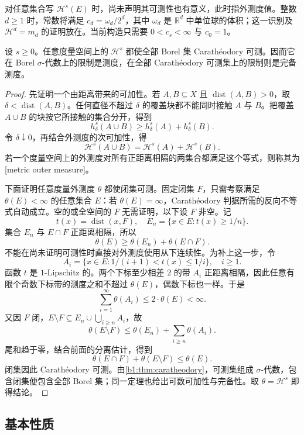 对任意集合写 \(\mathcal H^s(E)\) 时，尚未声明其可测性也有意义，此时指外测度值。整数 \(d\geq1\) 时，常数将满足 \(c_d=\omega_d/2^d\)，其中 \(\omega_d\) 是 \(\mathbb R^d\) 中单位球的体积；这一识别及 \(\mathcal H^d=m_d\) 的证明放在。当前构造只需要 \(0<c_s<\infty\) 与 \(c_0=1\)。

\begin{theorem}
\label{b1:thm:hausdorff-borel-measure}
设 \(s\ge0\)。任意度量空间上的 \(\mathcal H^s\) 都使全部 Borel 集 Carathéodory 可测。因而它在 Borel \(\sigma\)-代数上的限制是测度，在全部 Carathéodory 可测集上的限制则是完备测度。
\end{theorem}
\begin{proof}
先证明一个由距离带来的可加性。若 \(A,B\subseteq X\) 且 \(\operatorname{dist}(A,B)>0\)，取 \(\delta<\operatorname{dist}(A,B)\)。任何直径不超过 \(\delta\) 的覆盖块都不能同时接触 \(A\) 与 \(B\)。把覆盖 \(A\cup B\) 的块按它所接触的集合分开，得到
\[
h^s_\delta(A\cup B)\geq h^s_\delta(A)+h^s_\delta(B).
\]
令 \(\delta\downarrow0\)，再结合外测度的次可加性，得
\[
\mathcal H^s(A\cup B)=\mathcal H^s(A)+\mathcal H^s(B).
\]
若一个度量空间上的外测度对所有正距离相隔的两集合都满足这个等式，则称其为[metric outer measure]。

下面证明任意度量外测度 \(\theta\) 都使闭集可测。固定闭集 \(F\)，只需考察满足 \(\theta(E)<\infty\) 的任意集合 \(E\)：若 \(\theta(E)=\infty\)，Carathéodory 判据所需的反向不等式自动成立。空的或全空间的 \(F\) 无需证明，以下设 \(F\) 非空。记
\[
t(x)=\operatorname{dist}(x,F),
\quad E_n=\{x\in E:t(x)\geq1/n\}.
\]
集合 \(E_n\) 与 \(E\cap F\) 正距离相隔，所以
\[
\theta(E)\geq\theta(E_n)+\theta(E\cap F).
\]
不能在尚未证明可测性时直接对外测度使用从下连续性。为补上这一步，令
\[
A_i=\{x\in E:1/(i+1)<t(x)\leq1/i\},
\quad i\geq1.
\]
函数 \(t\) 是 \(1\)-Lipschitz 的。两个下标至少相差 \(2\) 的带 \(A_i\) 正距离相隔，因此任意有限个奇数下标带的测度之和不超过 \(\theta(E)\)，偶数下标也一样。于是
\[
\sum_{i=1}^{\infty}\theta(A_i)\leq2\cdot \theta(E)<\infty.
\]
又因 \(F\) 闭，\(E\setminus F\subseteq E_n\cup\bigcup_{i\geq n}A_i\)，故
\[
\theta(E\setminus F)
\leq\theta(E_n)+\sum_{i\geq n}\theta(A_i).
\]
尾和趋于零，结合前面的分离估计，得到
\[
\theta(E\cap F)+\theta(E\setminus F)\leq\theta(E).
\]
闭集因此 Carathéodory 可测。由\cref{b1:thm:caratheodory}，可测集组成 \(\sigma\)-代数，包含闭集便包含全部 Borel 集；同一定理也给出可数可加性与完备性。取 \(\theta=\mathcal H^s\) 即得结论。
\end{proof}

\subsection{基本性质}
\label{b1:subsec:150103}

